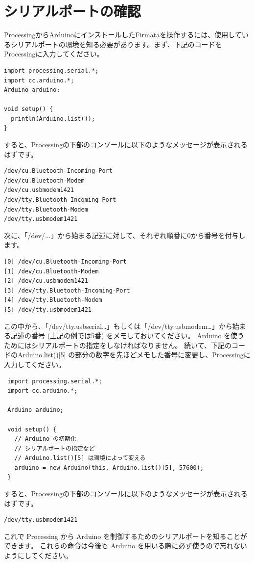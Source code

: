 \documentclass[11pt,a4paper]{jarticle}
\begin{document}
\section{シリアルポートの確認}
ProcessingからArduinoにインストールしたFirmataを操作するには、使用しているシリアルポートの環境を知る必要があります。まず、下記のコードをProcessingに入力してください。
\begin{lstlisting}
import processing.serial.*;
import cc.arduino.*;
Arduino arduino;
 
void setup() {
  println(Arduino.list());
}
\end{lstlisting}
すると、Processingの下部のコンソールに以下のようなメッセージが表示されるはずです。
\begin{lstlisting}
/dev/cu.Bluetooth-Incoming-Port
/dev/cu.Bluetooth-Modem
/dev/cu.usbmodem1421
/dev/tty.Bluetooth-Incoming-Port
/dev/tty.Bluetooth-Modem
/dev/tty.usbmodem1421
\end{lstlisting}
次に、「/dev/...」から始まる記述に対して、それぞれ順番に0から番号を付与します。
\begin{lstlisting}
[0] /dev/cu.Bluetooth-Incoming-Port
[1] /dev/cu.Bluetooth-Modem
[2] /dev/cu.usbmodem1421
[3] /dev/tty.Bluetooth-Incoming-Port
[4] /dev/tty.Bluetooth-Modem
[5] /dev/tty.usbmodem1421
\end{lstlisting}
この中から、「/dev/tty.usbserial…」もしくは「/dev/tty.usbmodem…」から始まる記述の番号 (上記の例では5番) をメモしておいてください。
Arduino を使うためにはシリアルポートの指定をしなければなりません。
続いて、下記のコードのArduino.list()[5] の部分の数字を先ほどメモした番号に変更し、Processingに入力してください。
\begin{lstlisting}
 import processing.serial.*;
 import cc.arduino.*;

 Arduino arduino;

 void setup() {
   // Arduino の初期化
   // シリアルポートの指定など
   // Arduino.list()[5] は環境によって変える
   arduino = new Arduino(this, Arduino.list()[5], 57600);
 }
\end{lstlisting}
すると、Processingの下部のコンソールに以下のようなメッセージが表示されるはずです。
\begin{lstlisting}
/dev/tty.usbmodem1421
\end{lstlisting}

これで Processing から Arduino を制御するためのシリアルポートを知ることができます。
これらの命令は今後も Arduino を用いる際に必ず使うので忘れないようにしてください。
\end{document}
